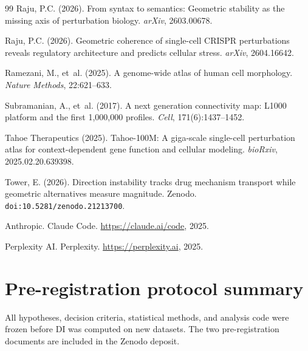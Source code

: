 \documentclass[11pt]{article}
\begin{document}
\begin{thebibliography}{99}
Raju, P.C. (2026).
From syntax to semantics: Geometric stability as the missing axis of perturbation biology.
\textit{arXiv}, 2603.00678.

Raju, P.C. (2026).
Geometric coherence of single-cell CRISPR perturbations reveals regulatory architecture and predicts cellular stress.
\textit{arXiv}, 2604.16642.

Ramezani, M., et~al. (2025).
A genome-wide atlas of human cell morphology.
\textit{Nature Methods}, 22:621--633.

Subramanian, A., et~al. (2017).
A next generation connectivity map: L1000 platform and the first 1,000,000 profiles.
\textit{Cell}, 171(6):1437--1452.

Tahoe Therapeutics (2025).
Tahoe-100M: A giga-scale single-cell perturbation atlas for context-dependent gene function and cellular modeling.
\textit{bioRxiv}, 2025.02.20.639398.

Tower, E. (2026).
Direction instability tracks drug mechanism transport while geometric alternatives measure magnitude.
Zenodo. \texttt{doi:10.5281/zenodo.21213700}.

Anthropic.
Claude Code.
\url{https://claude.ai/code}, 2025.

Perplexity AI.
Perplexity.
\url{https://perplexity.ai}, 2025.

\end{thebibliography}

\clearpage
\appendix

\section{Pre-registration protocol summary}
\label{app:prereg}

All hypotheses, decision criteria, statistical methods, and analysis
code were frozen before DI was computed on new datasets.  The two
pre-registration documents are included in the Zenodo deposit.
\end{document}
